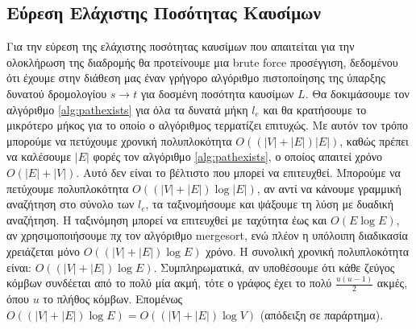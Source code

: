 \documentclass{article}
\begin{document}
\subsection*{Εύρεση Ελάχιστης Ποσότητας Καυσίμων}
Για την εύρεση της ελάχιστης ποσότητας καυσίμων που απαιτείται για την ολοκλήρωση της διαδρομής θα προτείνουμε μια \foreignlanguage{english}{brute force} προσέγγιση, δεδομένου ότι έχουμε στην διάθεση μας έναν γρήγορο αλγόριθμο πιστοποίησης της ύπαρξης δυνατού δρομολογίου $ s \rightarrow t$ για δοσμένη ποσότητα καυσίμων $ L $. Θα δοκιμάσουμε τον αλγόριθμο \ref{alg:pathexists} για όλα τα δυνατά μήκη $l_e$ και θα κρατήσουμε το μικρότερο μήκος για το οποίο ο αλγόριθμος τερματίζει επιτυχώς. Με αυτόν τον τρόπο μπορούμε να πετύχουμε χρονική πολυπλοκότητα $ O((|V|+|E|)|E|) $, καθώς πρέπει να καλέσουμε $ |E| $ φορές τον αλγόριθμο \ref{alg:pathexists}, ο οποίος απαιτεί χρόνο $ O(|Ε| + |V|) $. Αυτό δεν είναι το βέλτιστο που μπορεί να επιτευχθεί. Μπορούμε να πετύχουμε πολυπλοκότητα $ O((|V|+|E|)\log{|E|}) $, αν αντί να κάνουμε γραμμική αναζήτηση στο σύνολο των $ l_e $, τα ταξινομήσουμε και ψάξουμε τη λύση με δυαδική αναζήτηση. Η ταξινόμηση μπορεί να επιτευχθεί με ταχύτητα έως και $ O(E\log{E}) $, αν χρησιμοποιήσουμε πχ τον αλγόριθμο \foreignlanguage{english}{mergesort}, ενώ πλέον η υπόλοιπη διαδικασία χρειάζεται μόνο $ O((|V|+|E|)\log{E}) $ χρόνο. Η συνολική χρονική πολυπλοκότητα είναι: $ O((|V|+|E|)\log{E}) $. Συμπληρωματικά, αν υποθέσουμε ότι κάθε ζεύγος κόμβων συνδέεται από το πολύ μία ακμή, τότε ο γράφος έχει το πολύ $\frac{u(u-1)}{2}$ ακμές, όπου $ u $ το πλήθος κόμβων. Επομένως $ Ο((|V|+|E|)\log{E}) = Ο((|V|+|E|)\log{V})$ (απόδειξη σε παράρτημα).

\end{document}
